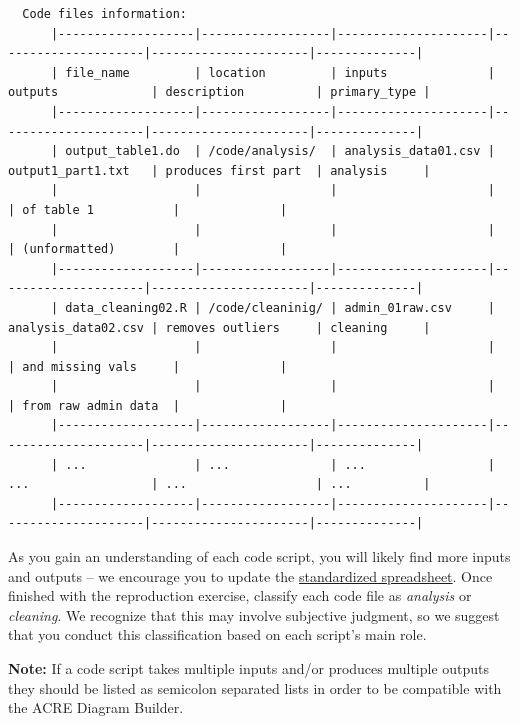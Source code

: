 \documentclass[]{book}
\begin{document}
\begin{verbatim}
  Code files information:
      |-------------------|------------------|---------------------|---------------------|----------------------|--------------|
      | file_name         | location         | inputs              | outputs             | description          | primary_type |
      |-------------------|------------------|---------------------|---------------------|----------------------|--------------|
      | output_table1.do  | /code/analysis/  | analysis_data01.csv | output1_part1.txt   | produces first part  | analysis     |
      |                   |                  |                     |                     | of table 1           |              |
      |                   |                  |                     |                     | (unformatted)        |              |
      |-------------------|------------------|---------------------|---------------------|----------------------|--------------|
      | data_cleaning02.R | /code/cleaninig/ | admin_01raw.csv     | analysis_data02.csv | removes outliers     | cleaning     |
      |                   |                  |                     |                     | and missing vals     |              |
      |                   |                  |                     |                     | from raw admin data  |              |
      |-------------------|------------------|---------------------|---------------------|----------------------|--------------|
      | ...               | ...              | ...                 | ...                 | ...                  | ...          |
      |-------------------|------------------|---------------------|---------------------|----------------------|--------------|
\end{verbatim}

As you gain an understanding of each code script, you will likely find more inputs and outputs -- we encourage you to update the \href{https://docs.google.com/spreadsheets/d/1LUIdVFH0OfR70C7z07TYeE-uWzKI_JIeWUMaYhqEKK0/edit\#gid=1617799822\&range=A1}{standardized spreadsheet}. Once finished with the reproduction exercise, classify each code file as \emph{analysis} or \emph{cleaning}. We recognize that this may involve subjective judgment, so we suggest that you conduct this classification based on each script's main role.

\textbf{Note:} If a code script takes multiple inputs and/or produces multiple outputs they should be listed as semicolon separated lists in order to be compatible with the ACRE Diagram Builder.
\end{document}
